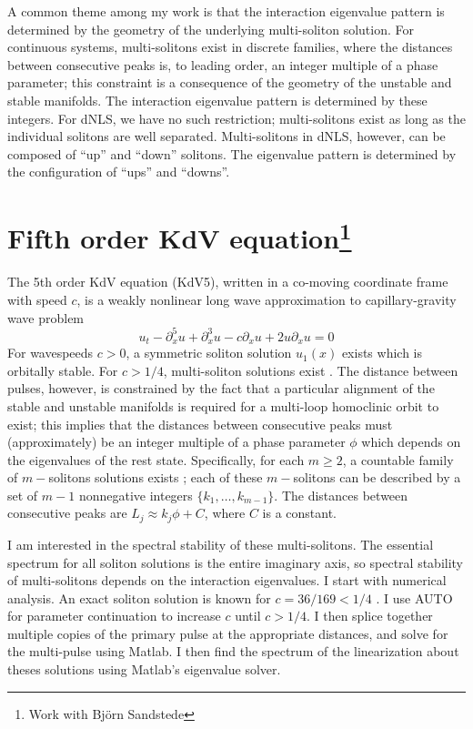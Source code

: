 \documentclass[12pt,reqno]{amsart}
\theoremstyle{definition}
\theoremstyle{remark}
\begin{document}
A common theme among my work is that the interaction eigenvalue pattern is determined by the geometry of the underlying multi-soliton solution. For continuous systems, multi-solitons exist in discrete families, where the distances between consecutive peaks is, to leading order, an integer multiple of a phase parameter; this constraint is a consequence of the geometry of the unstable and stable manifolds. The interaction eigenvalue pattern is determined by these integers. For dNLS, we have no such restriction; multi-solitons exist as long as the individual solitons are well separated. Multi-solitons in dNLS, however, can be composed of ``up'' and ``down'' solitons. The eigenvalue pattern is determined by the configuration of ``ups'' and ``downs''.

\section{Fifth order KdV equation\footnote{Work with Bj\"{o}rn Sandstede}}

The 5th order KdV equation (KdV5), written in a co-moving coordinate frame with speed $c$, is a weakly nonlinear long wave approximation to capillary-gravity wave problem
\begin{equation}\label{KdV5}
u_t - \partial_x^5 u + \partial_x^3 u - c \partial_x u + 2 u \partial_x u = 0
\end{equation}
For wavespeeds $c > 0$, a symmetric soliton solution $u_1(x)$ exists \cite{pelinovsky_2011} which is orbitally stable. For $c > 1/4$, multi-soliton solutions exist \cite{Buffoni1996,SandstedeStrut}. The distance between pulses, however, is constrained by the fact that a particular alignment of the stable and unstable manifolds is required for a multi-loop homoclinic orbit to exist; this implies that the distances between consecutive peaks must (approximately) be an integer multiple of a phase parameter $\phi$ which depends on the eigenvalues of the rest state. Specifically, for each $m \geq 2$, a countable family of $m-$solitons solutions exists \cite[Theorem~3.6]{SandstedeStrut}; each of these $m-$solitons can be described by a set of $m-1$ nonnegative integers $\{ k_1, \dots, k_{m-1} \}$. The distances between consecutive peaks are $L_j \approx k_j \phi + C$, where $C$ is a constant.

I am interested in the spectral stability of these multi-solitons. The essential spectrum for all soliton solutions is the entire imaginary axis, so spectral stability of multi-solitons depends on the interaction eigenvalues. I start with numerical analysis. An exact soliton solution is known for $c = 36/169 < 1/4$ \cite{Pelinovsky2007}. I use AUTO for parameter continuation to increase $c$ until $c > 1/4$. I then splice together multiple copies of the primary pulse at the appropriate distances, and solve for the multi-pulse using Matlab. I then find the spectrum of the linearization about theses solutions using Matlab's eigenvalue solver.
\end{document}
